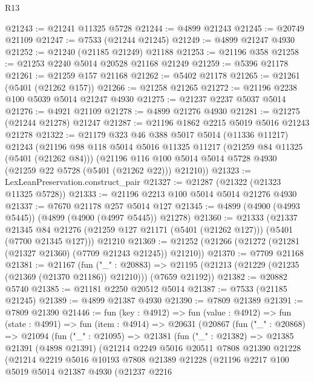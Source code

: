 \begin{lexlean}{R13}
\begin{coremodule}
@21243 := @21241 @11325 @5728
@21244 := @4899 @21243
@21245 := @20749 @21109
@21247 := @7533 (@21244 @21245)
@21249 := @4899 @21247 @4930
@21252 := @21240 (@21185 @21249) @21188
@21253 := @21196 @358
@21258 := @21253 @2240 @5014 @20528 @21168 @21249
@21259 := @5396 @21178
@21261 := @21259 @157 @21168
@21262 := @5402 @21178
@21265 := @21261 (@5401 (@21262 @157))
@21266 := @21258 @21265
@21272 := @21196 @2238 @100 @5039 @5014 @21247 @4930
@21275 := @21237 @2237 @5037 @5014
@21276 := @4921 @21109
@21278 := @4899 @21276 @4930
@21281 := @21275 (@21244 @21278) @21247
@21287 := @21196 @1862 @2215 @5019 @5016 @21243 @21278
@21322 := @21179
    @323
    @46
    @388
    @5017
    @5014
    (@11336 @11217)
    @21243
    (@21196
      @98
      @118
      @5014
      @5016
      @11325
      @11217
      (@21259 @84 @11325 (@5401 (@21262 @84)))
      (@21196 @116 @100 @5014 @5014 @5728 @4930 (@21259 @22 @5728 (@5401 (@21262 @22))) @21210))
@21323 := LexLeanPreservation.construct_pair
@21327 := @21287 (@21322 (@21323 @11325 @5728))
@21333 := @21196 @2213 @100 @5014 @5014 @21276 @4930
@21337 := @7670 @21178 @257 @5014 @127
@21345 := @4899 (@4900 (@4993 @5445)) (@4899 (@4900 (@4997 @5445)) @21278)
@21360 := @21333
    (@21337
      @21345
      @84
      @21276
      (@21259 @127 @21171 (@5401 (@21262 @127)))
      (@5401 (@7700 @21345 @127)))
    @21210
@21369 := @21252 (@21266 (@21272 (@21281 (@21327 @21360) (@7709 @21243 @21245)) @21210))
@21370 := @7709 @21168
@21381 := @21167
    (fun ("_" : @20883) =>
    @21195 (@21213 (@21229 (@21235 (@21369 (@21370 @21186)) @21210))) (@7659 @21192))
@21382 := @20882 @5740
@21385 := @21181 @2250 @20512 @5014
@21387 := @7533 (@21185 @21245)
@21389 := @4899 @21387 @4930
@21390 := @7809 @21389
@21391 := @7809 @21390
@21446 := fun (key : @4912) =>
  fun (value : @4912) =>
  fun (state : @4991) =>
  fun (item : @4914) =>
  @20631
    (@20867
      (fun ("_" : @20868) =>
      @21094
        (fun ("_" : @21095) =>
        @21381
          (fun ("_" : @21382) =>
          @21385
            @21391
            (@4898 @21391)
            (@21214
              @2249
              @5016
              @20511
              @7808
              @21390
              @21228
              (@21214
                @2219
                @5016
                @10193
                @7808
                @21389
                @21228
                (@21196
                  @2217
                  @100
                  @5019
                  @5014
                  @21387
                  @4930
                  (@21237
                    @2216

\end{coremodule}
\end{lexlean}
